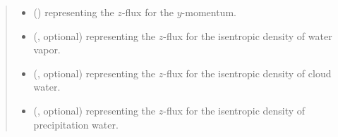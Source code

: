 \documentclass[letterpaper,10pt,english]{sphinxmanual}
\begin{document}
\begin{fulllineitems}
\begin{fulllineitems}
\begin{quote}
\begin{description}
\begin{itemize}
\item {} 
 () \textendash{}  representing the \(z\)-flux for the \(y\)-momentum.

\item {} 
 (, optional) \textendash{}  representing the \(z\)-flux for the isentropic density of water vapor.

\item {} 
 (, optional) \textendash{}  representing the \(z\)-flux for the isentropic density of cloud water.

\item {} 
 (, optional) \textendash{}  representing the \(z\)-flux for the isentropic density of precipitation water.

\end{itemize}


\end{description}\end{quote}

\end{fulllineitems}


\end{fulllineitems}

\end{document}
